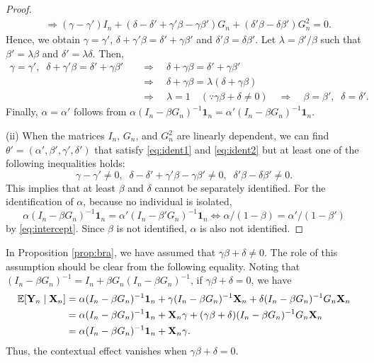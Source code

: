 \documentclass[11pt, A4paper, openany, uplatex]{book}
\begin{document}
\begin{proof}
\begin{align}
	& \Longrightarrow (\gamma - \gamma') I_n + (\delta - \delta' + \gamma'\beta - \gamma\beta' )G_n + (\delta'\beta - \delta\beta') G_n^2 =0. \label{eq:ident2}
	\end{align}
	Hence, we obtain $\gamma = \gamma'$, $\delta  + \gamma'\beta = \delta' + \gamma\beta'$ and $\delta'\beta = \delta\beta'$.
	Let $\lambda = \beta'/\beta$ such that $\beta' = \lambda \beta$ and $\delta' = \lambda \delta$.
	Then, 
	\begin{align*}
	\gamma = \gamma',\;\; \delta  + \gamma'\beta = \delta' + \gamma\beta' \quad 
	& \Longrightarrow\quad \delta  + \gamma \beta = \delta' + \gamma\beta' \\
	& \Longrightarrow \quad \delta  + \gamma \beta = \lambda (\delta + \gamma \beta) \\
	& \Longrightarrow \quad \lambda = 1 \quad (\because \gamma \beta + \delta \neq 0) \quad \Longrightarrow \quad \beta = \beta', \;\; \delta = \delta'.
	\end{align*}
	Finally, $\alpha = \alpha'$ follows from $\alpha (I_n - \beta G_n)^{-1}\mathbf{1}_n = \alpha' (I_n - \beta G_n)^{-1}\mathbf{1}_n$.
	
	(ii) When the matrices $I_n$, $G_n$, and $G_n^2$ are linearly dependent, we can find $\theta' = (\alpha', \beta', \gamma', \delta')$ that satisfy \eqref{eq:ident1} and \eqref{eq:ident2} but at least one of the following inequalities holds:
	\[
	\gamma - \gamma' \neq 0, \;\; \delta - \delta' + \gamma'\beta - \gamma\beta' \neq 0, \;\; \delta'\beta - \delta\beta' \neq 0.
	\]
	This implies that at least $\beta$ and $\delta$ cannot be separately identified.
	For the identification of $\alpha$, because no individual is isolated,
	\[
	\alpha (I_n - \beta G_n)^{-1}\mathbf{1}_n = \alpha' (I_n - \beta' G_n)^{-1}\mathbf{1}_n \iff \alpha/(1 - \beta) = \alpha'/(1 - \beta')
	\]
	by \eqref{eq:intercept}.
	Since $\beta$ is not identified, $\alpha$ is also not identified.
\end{proof}
\bigskip

In Proposition \ref{prop:bra}, we have assumed that $\gamma \beta + \delta \neq 0$.
The role of this assumption should be clear from the following equality.
Noting that $(I_n - \beta G_n)^{-1} = I_n +  \beta G_n(I_n - \beta G_n)^{-1}$, if $\gamma \beta + \delta = 0$, we have
\begin{align*}
	\mathbb{E}[\mathbf{Y}_n \mid \mathbf{X}_n] 
	& = \alpha (I_n - \beta G_n)^{-1}\mathbf{1}_n + \gamma (I_n - \beta G_n)^{-1}\mathbf{X}_n + \delta (I_n - \beta G_n)^{-1}G_n \mathbf{X}_n\\
	& = \alpha (I_n - \beta G_n)^{-1}\mathbf{1}_n + \mathbf{X}_n \gamma +  (\gamma \beta + \delta) (I_n - \beta G_n)^{-1}G_n \mathbf{X}_n \\
	& = \alpha (I_n - \beta G_n)^{-1}\mathbf{1}_n + \mathbf{X}_n \gamma.
\end{align*}
Thus, the contextual effect vanishes when $\gamma \beta + \delta = 0$.
\bigskip
\end{document}
